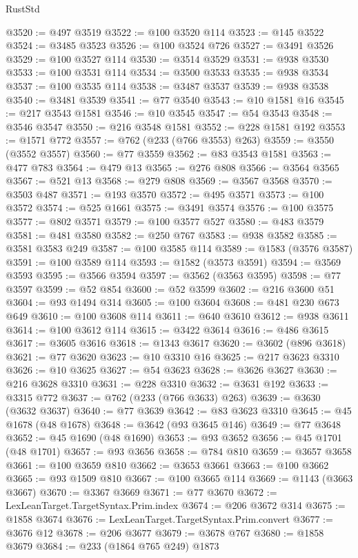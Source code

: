 \begin{lexlean}{RustStd}
\begin{coremodule}
@3520 := @497 @3519
@3522 := @100 @3520 @114
@3523 := @145 @3522
@3524 := @3485 @3523
@3526 := @100 @3524 @726
@3527 := @3491 @3526
@3529 := @100 @3527 @114
@3530 := @3514 @3529
@3531 := @938 @3530
@3533 := @100 @3531 @114
@3534 := @3500 @3533
@3535 := @938 @3534
@3537 := @100 @3535 @114
@3538 := @3487 @3537
@3539 := @938 @3538
@3540 := @3481 @3539
@3541 := @77 @3540
@3543 := @10 @1581 @16
@3545 := @217 @3543 @1581
@3546 := @10 @3545
@3547 := @54 @3543
@3548 := @3546 @3547
@3550 := @216 @3548 @1581
@3552 := @228 @1581 @192
@3553 := @1571 @772
@3557 := @762 (@233 (@766 @3553) @263)
@3559 := @3550 (@3552 @3557)
@3560 := @77 @3559
@3562 := @83 @3543 @1581
@3563 := @477 @783
@3564 := @479 @13
@3565 := @276 @808
@3566 := @3564 @3565
@3567 := @521 @13
@3568 := @279 @808
@3569 := @3567 @3568
@3570 := @3503 @487
@3571 := @193 @3570
@3572 := @495 @3571
@3573 := @100 @3572
@3574 := @525 @1661
@3575 := @3491 @3574
@3576 := @100 @3575
@3577 := @802 @3571
@3579 := @100 @3577 @527
@3580 := @483 @3579
@3581 := @481 @3580
@3582 := @250 @767
@3583 := @938 @3582
@3585 := @3581 @3583 @249
@3587 := @100 @3585 @114
@3589 := @1583 (@3576 @3587)
@3591 := @100 @3589 @114
@3593 := @1582 (@3573 @3591)
@3594 := @3569 @3593
@3595 := @3566 @3594
@3597 := @3562 (@3563 @3595)
@3598 := @77 @3597
@3599 := @52 @854
@3600 := @52 @3599
@3602 := @216 @3600 @51
@3604 := @93 @1494 @314
@3605 := @100 @3604
@3608 := @481 @230 @673 @649
@3610 := @100 @3608 @114
@3611 := @640 @3610
@3612 := @938 @3611
@3614 := @100 @3612 @114
@3615 := @3422 @3614
@3616 := @486 @3615
@3617 := @3605 @3616
@3618 := @1343 @3617
@3620 := @3602 (@896 @3618)
@3621 := @77 @3620
@3623 := @10 @3310 @16
@3625 := @217 @3623 @3310
@3626 := @10 @3625
@3627 := @54 @3623
@3628 := @3626 @3627
@3630 := @216 @3628 @3310
@3631 := @228 @3310
@3632 := @3631 @192
@3633 := @3315 @772
@3637 := @762 (@233 (@766 @3633) @263)
@3639 := @3630 (@3632 @3637)
@3640 := @77 @3639
@3642 := @83 @3623 @3310
@3645 := @45 @1678 (@48 @1678)
@3648 := @3642 (@93 @3645 @146)
@3649 := @77 @3648
@3652 := @45 @1690 (@48 @1690)
@3653 := @93 @3652
@3656 := @45 @1701 (@48 @1701)
@3657 := @93 @3656
@3658 := @784 @810
@3659 := @3657 @3658
@3661 := @100 @3659 @810
@3662 := @3653 @3661
@3663 := @100 @3662
@3665 := @93 @1509 @810
@3667 := @100 @3665 @114
@3669 := @1143 (@3663 @3667)
@3670 := @3367 @3669
@3671 := @77 @3670
@3672 := LexLeanTarget.TargetSyntax.Prim.index
@3674 := @206 @3672 @314
@3675 := @1858 @3674
@3676 := LexLeanTarget.TargetSyntax.Prim.convert
@3677 := @3676 @12
@3678 := @206 @3677
@3679 := @3678 @767
@3680 := @1858 @3679
@3684 := @233 (@1864 @765 @249) @1873

\end{coremodule}
\end{lexlean}
